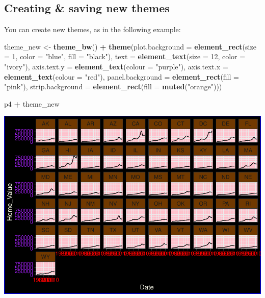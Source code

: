 \documentclass[
]{book}
\newenvironment{Shaded}{\begin{snugshade}}{\end{snugshade}}
\newcommand{\DataTypeTok}[1]{\textcolor[rgb]{0.13,0.29,0.53}{#1}}
\newcommand{\DecValTok}[1]{\textcolor[rgb]{0.00,0.00,0.81}{#1}}
\newcommand{\KeywordTok}[1]{\textcolor[rgb]{0.13,0.29,0.53}{\textbf{#1}}}
\newcommand{\NormalTok}[1]{#1}
\newcommand{\OperatorTok}[1]{\textcolor[rgb]{0.81,0.36,0.00}{\textbf{#1}}}
\newcommand{\StringTok}[1]{\textcolor[rgb]{0.31,0.60,0.02}{#1}}
\begin{document}
\hypertarget{creating-saving-new-themes}{%
\subsection{Creating \& saving new themes}\label{creating-saving-new-themes}}

You can create new themes, as in the following example:

\begin{Shaded}
\begin{Highlighting}[]
\NormalTok{theme\_new \textless{}{-}}\StringTok{ }\KeywordTok{theme\_bw}\NormalTok{() }\OperatorTok{+}
\StringTok{  }\KeywordTok{theme}\NormalTok{(}\DataTypeTok{plot.background =} \KeywordTok{element\_rect}\NormalTok{(}\DataTypeTok{size =} \DecValTok{1}\NormalTok{, }\DataTypeTok{color =} \StringTok{"blue"}\NormalTok{, }\DataTypeTok{fill =} \StringTok{"black"}\NormalTok{),}
        \DataTypeTok{text =} \KeywordTok{element\_text}\NormalTok{(}\DataTypeTok{size =} \DecValTok{12}\NormalTok{, }\DataTypeTok{color =} \StringTok{"ivory"}\NormalTok{),}
        \DataTypeTok{axis.text.y =} \KeywordTok{element\_text}\NormalTok{(}\DataTypeTok{colour =} \StringTok{"purple"}\NormalTok{),}
        \DataTypeTok{axis.text.x =} \KeywordTok{element\_text}\NormalTok{(}\DataTypeTok{colour =} \StringTok{"red"}\NormalTok{),}
        \DataTypeTok{panel.background =} \KeywordTok{element\_rect}\NormalTok{(}\DataTypeTok{fill =} \StringTok{"pink"}\NormalTok{),}
        \DataTypeTok{strip.background =} \KeywordTok{element\_rect}\NormalTok{(}\DataTypeTok{fill =} \KeywordTok{muted}\NormalTok{(}\StringTok{"orange"}\NormalTok{)))}

\NormalTok{p4 }\OperatorTok{+}\StringTok{ }\NormalTok{theme\_new}
\end{Highlighting}
\end{Shaded}

\includegraphics{R/Rgraphics/figures/unnamed-chunk-211-1.pdf}
\end{document}
